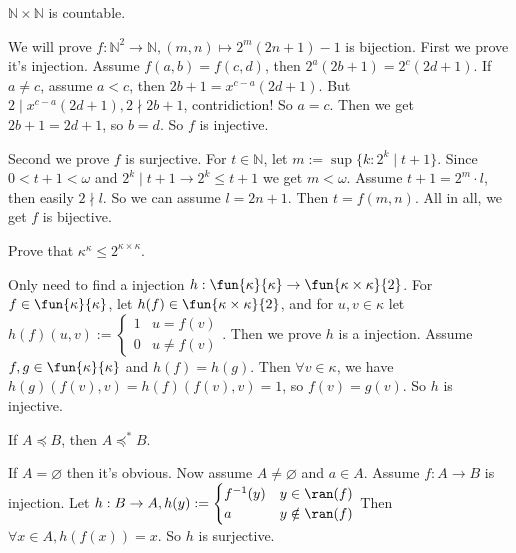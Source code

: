 \documentclass{ctexart}
\begin{document}
\begin{problem}
  $\mathbb{N} \times \mathbb{N}$ is countable.
\end{problem}

\begin{solution}
  We will prove $f:\mathbb{N}^2\to \mathbb{N},(m,n)\mapsto 2^m(2n+1)-1$ is bijection. First we prove it's injection. Assume $f(a,b)=f(c,d)$, then $2^a(2b+1)=2^c(2d+1)$. If $a\neq c$, assume $a<c$, then $2b+1=x^{c-a}(2d+1)$. But $2\mid x^{c-a}(2d+1),2\nmid 2b+1$, contridiction! So $a=c$. Then we get $2b+1=2d+1$, so $b=d$. So $f$ is injective.

  Second we prove $f$ is surjective. For $t\in \mathbb{N}$, let $m:=\sup\{k:2^k\mid t+1\}$. Since $0<t+1<\omega$ and $2^k\mid t+1\to 2^k\leq t+1$ we get $m<\omega$. Assume $t+1=2^m\cdot l$, then easily $2\nmid l$. So we can assume $l=2n+1$. Then $t=f(m,n)$.
  All in all, we get $f$ is bijective.
\end{solution}

\begin{problem}
  Prove that $\kappa^\kappa \leq 2^{\kappa \times \kappa}$.
\end{problem}

\begin{solution}
  Only need to find a injection $h:\fun{\kappa}{\kappa}\to \fun{\kappa\times \kappa}{2}$. For $f\in \fun{\kappa}{\kappa}$, let $h(f)\in \fun{\kappa\times \kappa}{2}$, and for $u,v\in \kappa$ let $h(f)(u,v):=
  \begin{cases}
    1 & u= f(v)    \\
    0 & u\neq f(v)
  \end{cases}$. Then we prove $h$ is a injection. Assume $f,g\in \fun{\kappa}{\kappa}$ and $h(f)=h(g)$. Then $\forall v\in \kappa$, we have $h(g)(f(v),v)=h(f)(f(v),v)=1$, so $f(v)=g(v)$. So $h$ is injective.
\end{solution}

\begin{problem}
  If $A \preccurlyeq B$, then $A \preccurlyeq^* B$.
\end{problem}

\begin{solution}
  If $A=\varnothing$ then it's obvious. Now assume $A\neq \varnothing$ and $a\in A$. Assume $f:A\to B$ is injection. Let $h:B\to A,h(y):=
  \begin{cases}
    f^{-1}(y) & y\in \ran(f)    \\
    a         & y\notin \ran(f)
  \end{cases}$
  Then $\forall x\in A,h(f(x))=x$. So $h$ is surjective.
\end{solution}
\end{document}
